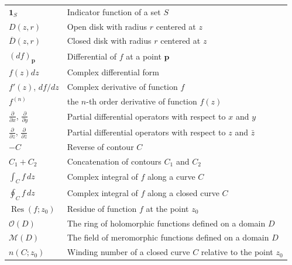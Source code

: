 \documentclass[11pt]{report}
\theoremstyle{definition}
\theoremstyle{remark}
\numberwithin{equation}{section}
\DeclareMathOperator{\Res}{\mathrm{Res}}
\begin{document}
\begin{longtable}{ll}
 $\mathbf{1}_S$ & Indicator function of a set $S$ \\
 $D(z,r)$ & Open disk with radius $r$ centered at $z$ \\
 $\overline{D}(z,r)$ & Closed disk with radius $r$ centered at $z$ \\
 $(df)_\mathbf{p}$ & Differential of $f$ at a point $\mathbf{p}$\\
 $f(z) dz$ & Complex differential form \\
 $f'(z)$, $df/dz$ & Complex derivative of function $f$\\
 $f^{(n)}$ & the $n$-th order derivative of function $f(z)$ \\
 $\frac{\partial}{\partial x}$, $\frac{\partial }{\partial y}$ &  Partial differential operators with respect to $x$ and $y$\\
 $\frac{\partial}{\partial z}$, $\frac{\partial }{\partial \bar{z}}$ &  Partial differential operators with respect to $z$ and $\bar{z}$ \\
 $-C$ & Reverse of contour $C$ \\
 $C_1+C_2$ & Concatenation of contours $C_1$ and $C_2$ \\
 $\int_C f \, dz$ & Complex integral of $f$ along a curve $C$\\
 $\oint_C f \, dz$ & Complex integral of $f$ along a closed curve $C$\\ 
 $\Res(f;z_0)$ & Residue of function $f$ at the point $z_0$ \\
 $\mathcal{O}(D)$ & The ring of holomorphic functions defined on a domain $D$ \\
$\mathcal{M}(D)$ & The field of meromorphic functions defined on a domain $D$ \\
 $n(C;z_0)$ & Winding number of a closed curve $C$ relative to the point $z_0$ 
\end{longtable}






%

%

%

%


\end{document}

